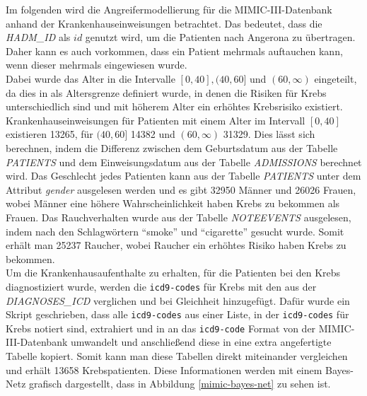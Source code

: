 \documentclass[german,version-2020-11]{uzl-thesis}
\begin{document}
Im folgenden wird die Angreifermodellierung für die MIMIC-III-Datenbank anhand der Krankenhauseinweisungen betrachtet. Das bedeutet, dass die \textit{HADM\_ID} als $id$ genutzt wird, um die Patienten nach Angerona zu übertragen. Daher kann es auch vorkommen, dass ein Patient mehrmals auftauchen kann, wenn dieser mehrmals eingewiesen wurde.\\ 
Dabei wurde das Alter in die Intervalle $[0,40], (40,60]$ und $(60,\infty)$ eingeteilt, da dies in \cite{13} als Altersgrenze definiert wurde, in denen die Risiken für Krebs unterschiedlich sind und mit höherem Alter ein erhöhtes Krebsrisiko existiert. Krankenhauseinweisungen für Patienten mit einem Alter im Intervall $[0,40]$ existieren 13265, für $(40,60]$ 14382 und $(60,\infty)$ 31329. Dies lässt sich berechnen, indem die Differenz zwischen dem Geburtsdatum aus der Tabelle \textit{PATIENTS} und dem Einweisungsdatum aus der Tabelle \textit{ADMISSIONS} berechnet wird.
Das Geschlecht jedes Patienten kann aus der Tabelle \textit{PATIENTS} unter dem Attribut \textit{gender} ausgelesen werden und es gibt 32950 Männer und 26026 Frauen, wobei Männer eine höhere Wahrscheinlichkeit haben Krebs zu bekommen als Frauen. Das Rauchverhalten wurde aus der Tabelle \textit{NOTEEVENTS} ausgelesen, indem nach den Schlagwörtern \enquote{smoke} und \enquote{cigarette} gesucht wurde. Somit erhält man 25237 Raucher, wobei Raucher ein erhöhtes Risiko haben Krebs zu bekommen. \\
Um die Krankenhausaufenthalte zu erhalten, für die Patienten bei den  Krebs diagnostiziert wurde, werden die \texttt{icd9-codes} für Krebs \cite{16} mit den aus der \textit{DIAGNOSES\_ICD} verglichen und bei Gleichheit hinzugefügt. Dafür wurde ein Skript geschrieben, dass alle \texttt{icd9-codes} aus einer Liste, in der \texttt{icd9-codes} für Krebs notiert sind, extrahiert und in an das \texttt{icd9-code} Format von der MIMIC-III-Datenbank umwandelt und anschließend diese in eine extra angefertigte Tabelle kopiert. Somit kann man diese Tabellen direkt miteinander vergleichen und erhält 13658 Krebspatienten. 
Diese Informationen werden mit einem Bayes-Netz grafisch dargestellt, dass in Abbildung \ref{mimic-bayes-net} zu sehen ist.\\
\end{document}
